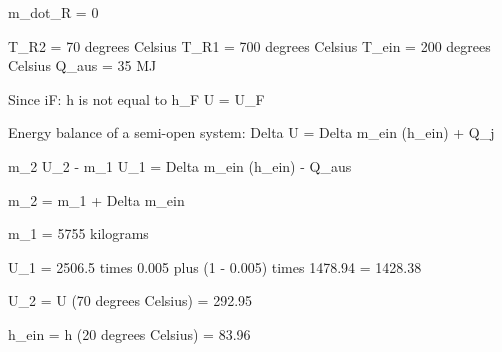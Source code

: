 m_dot_R = 0  

T_R2 = 70 degrees Celsius  
T_R1 = 700 degrees Celsius  
T_ein = 200 degrees Celsius  
Q_aus = 35 MJ  

Since iF:  
h is not equal to h_F  
U = U_F  

Energy balance of a semi-open system:  
Delta U = Delta m_ein (h_ein) + Q_j  

m_2 U_2 - m_1 U_1 = Delta m_ein (h_ein) - Q_aus  

m_2 = m_1 + Delta m_ein  

m_1 = 5755 kilograms  

U_1 = 2506.5 times 0.005 plus (1 - 0.005) times 1478.94 = 1428.38  

U_2 = U (70 degrees Celsius) = 292.95  

h_ein = h (20 degrees Celsius) = 83.96